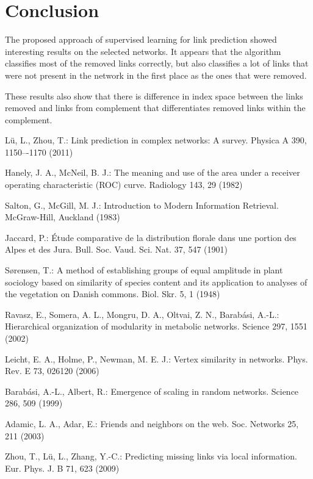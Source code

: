 \documentclass{llncs}
\begin{document}
\section{Conclusion}
%
The proposed approach of supervised learning for link prediction showed interesting results on the selected networks. It appears that the algorithm classifies most of the removed links correctly, but also classifies a lot of links that were not present in the network in the first place as the ones that were removed.

These results also show that there is difference in index space between the links removed and links from complement that differentiates removed links within the complement.
%
%
%
\begin{thebibliography}{28}

L{\"u}, L., Zhou, T.:
Link prediction in complex networks: A survey.
Physica A 390, 1150–-1170 (2011)

Hanely, J. A., McNeil, B. J.:
The meaning and use of the area under a receiver operating characteristic (ROC) curve.
Radiology 143, 29 (1982)

Salton, G., McGill, M. J.:
Introduction to Modern Information Retrieval.
McGraw-Hill, Auckland (1983)

Jaccard, P.:
{\'E}tude comparative de la distribution florale dans une portion des Alpes et des Jura.
Bull. Soc. Vaud. Sci. Nat. 37, 547 (1901)

S{\o}rensen, T.: 
A method of establishing groups of equal amplitude in plant sociology based on similarity of species content and its application to analyses of the vegetation on Danish commons.
Biol. Skr. 5, 1 (1948)

Ravasz, E., Somera, A. L., Mongru, D. A., Oltvai, Z. N., Barab{\'a}si, A.-L.:
Hierarchical organization of modularity in metabolic networks. 
Science 297, 1551 (2002)

Leicht, E. A., Holme, P., Newman, M. E. J.:
Vertex similarity in networks.
Phys. Rev. E 73, 026120 (2006)

Barab{\'a}si, A.-L., Albert, R.:
Emergence of scaling in random networks.
Science 286, 509 (1999)

Adamic, L. A., Adar, E.:
Friends and neighbors on the web.
Soc. Networks 25, 211 (2003)

Zhou, T., L{\"u}, L., Zhang, Y.-C.:
Predicting missing links via local information.
Eur. Phys. J. B 71, 623 (2009)


\end{thebibliography}
\end{document}
